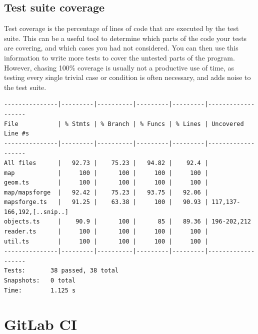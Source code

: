 \documentclass[hyphens]{final_report}
\begin{document}
\subsection{Test suite coverage}

Test coverage is the percentage of lines of code that are executed by the test suite. This can be a useful tool to determine which parts of the code your tests are covering, and which cases you had not considered. You can then use this information to write more tests to cover the untested parts of the program. However, chasing 100\% coverage is usually not a productive use of time, as testing every single trivial case or condition is often necessary, and adds noise to the test suite.

\begin{lstlisting}[caption=Test suite coverage, numbers=none, keepspaces=true, label=lst:test-coverage]
---------------|---------|----------|---------|---------|-------------------
File           | % Stmts | % Branch | % Funcs | % Lines | Uncovered Line #s                                               
---------------|---------|----------|---------|---------|-------------------
All files      |   92.73 |    75.23 |   94.82 |    92.4 |                                                                 
map            |     100 |      100 |     100 |     100 |                                                                 
geom.ts        |     100 |      100 |     100 |     100 |                                                                 
map/mapsforge  |   92.42 |    75.23 |   93.75 |   92.06 |                                                                 
mapsforge.ts   |   91.25 |    63.38 |     100 |   90.93 | 117,137-166,192,[..snip..] 
objects.ts     |    90.9 |      100 |      85 |   89.36 | 196-202,212                                                     
reader.ts      |     100 |      100 |     100 |     100 |                                                                 
util.ts        |     100 |      100 |     100 |     100 |                                                                 
---------------|---------|----------|---------|---------|-------------------
Tests:       38 passed, 38 total
Snapshots:   0 total
Time:        1.125 s
\end{lstlisting}

\section{GitLab CI}
\end{document}
